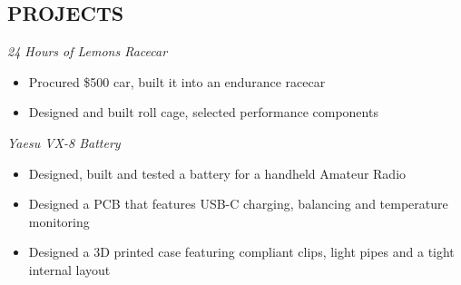 \documentclass[line,mmmargin]{res}
\begin{document}
\begin{resume}
\section{PROJECTS}
			
	{\sl 24 Hours of Lemons Racecar}
		\begin{itemize} \itemsep -2pt
			\item Procured \$500 car, built it into an endurance racecar
			\item Designed and built roll cage, selected performance components
		\end{itemize}
	\vspace{-10pt}
	{\sl Yaesu VX-8 Battery}
		\begin{itemize} \itemsep -2pt
			\item Designed, built and tested a battery for a
				handheld Amateur Radio
			\item Designed a PCB that features USB-C charging,
				balancing  and temperature monitoring
			\item Designed a 3D printed case featuring compliant
				clips, light pipes and a tight internal layout
		\end{itemize}

\end{resume}
\end{document}
